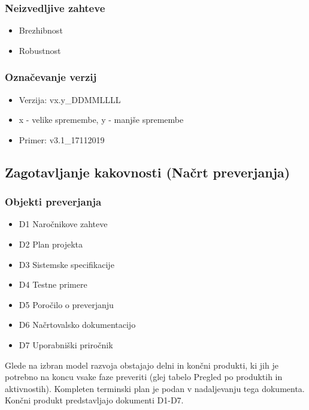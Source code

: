 \documentclass[a4paper,12pt]{article}
\begin{document}
		\subsubsection{Neizvedljive zahteve}

				\begin{itemize}
					\item Brezhibnost
					\item Robustnost
				\end{itemize}

		\subsubsection{Označevanje verzij}

				\begin{itemize}
					\item Verzija: vx.y\_DDMMLLLL
					\item x - velike spremembe, y - manjše spremembe
					\item Primer: v3.1\_17112019
				\end{itemize}

	\subsection{Zagotavljanje kakovnosti (Načrt preverjanja)}

\setul{0.6ex}{0.17ex}



		\subsubsection{Objekti preverjanja}

			\begin{itemize}
				\item D1 	Naročnikove zahteve
				\item D2 	Plan projekta
				\item D3 	Sistemske specifikacije
				\item D4 	Testne primere
				\item D5 	Poročilo o preverjanju
				\item D6 	Načrtovalsko dokumentacijo
				\item D7 	Uporabniški priročnik	
			\end{itemize}

			Glede na izbran model razvoja obstajajo delni in končni produkti, 
			ki jih je potrebno na koncu vsake faze preveriti (glej tabelo 
			Pregled po produktih in aktivnostih). Kompleten terminski plan 
			je podan v nadaljevanju tega dokumenta. Končni produkt 
			predstavljajo dokumenti D1-D7.
\end{document}
